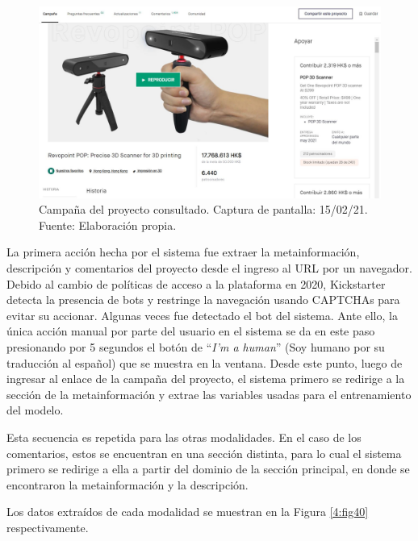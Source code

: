 \begin{figure}[!ht]
	\begin{center}
		\includegraphics[width=1.05\textwidth]{4/figures/example_project_150221.jpg}
		\caption[Campaña del proyecto consultado. Captura de pantalla: 15/02/21]{Campaña del proyecto consultado. Captura de pantalla: 15/02/21.\\
			Fuente: Elaboración propia.}
		\label{4:fig39}
	\end{center}
\end{figure}

La primera acción hecha por el sistema fue extraer la metainformación, descripción y comentarios del proyecto desde el ingreso al URL por un navegador. Debido al cambio de políticas de acceso a la plataforma en 2020, Kickstarter detecta la presencia de bots y restringe la navegación usando CAPTCHAs para evitar su accionar. Algunas veces fue detectado el bot del sistema. Ante ello, la única acción manual por parte del usuario en el sistema se da en este paso presionando por 5 segundos el botón de “\textit{I'm a human}” (Soy humano por su traducción al español) que se muestra en la ventana. Desde este punto, luego de ingresar al enlace de la campaña del proyecto, el sistema primero se redirige a la sección de la metainformación y extrae las variables usadas para el entrenamiento del modelo.

Esta secuencia es repetida para las otras modalidades. En el caso de los comentarios, estos se encuentran en una sección distinta, para lo cual el sistema primero se redirige a ella a partir del dominio de la sección principal, en donde se encontraron la metainformación y la descripción.

Los datos extraídos de cada modalidad se muestran en la Figura \ref{4:fig40} respectivamente.

